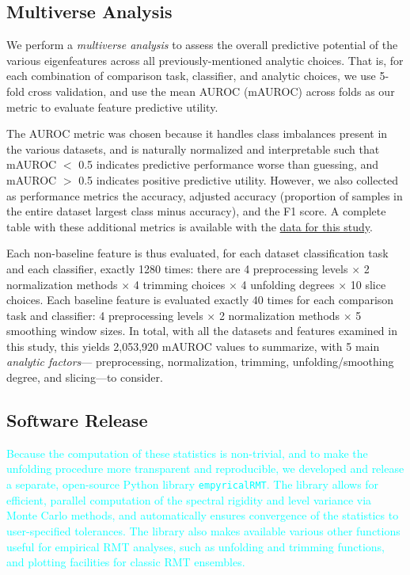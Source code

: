 \documentclass[12pt]{spieman}  %
\newcommand{\code}[1]{\small\texttt{#1}\normalsize}
\begin{document}
\begin{spacing}{2}
\subsection{Multiverse Analysis}
\label{sec:multiverse}

We perform a \textit{multiverse
analysis}\cite{steegenIncreasingTransparencyMultiverse2016} to assess the
overall predictive potential of the various eigenfeatures across all
previously-mentioned analytic choices. That is, for each combination of
comparison task, classifier, and analytic choices, we use 5-fold cross
validation, and use the mean AUROC (mAUROC) across folds as our metric to
evaluate feature predictive utility.

The AUROC metric was chosen because it handles class imbalances present in the
various datasets, and is naturally normalized and interpretable such that
mAUROC \(<\) 0.5 indicates predictive performance worse than guessing, and
mAUROC \(>\) 0.5 indicates positive predictive
utility\cite{mandrekarReceiverOperatingCharacteristic2010}. However, we also
collected as performance metrics the accuracy, adjusted accuracy (proportion of
samples in the entire dataset largest class minus accuracy), and the F1 score.
A complete table with these additional metrics is available with the
\hyperref[sec:data-and-code]{data for this study}.

Each non-baseline feature is thus evaluated, for each dataset classification
task and each classifier, exactly 1280 times: there are 4 preprocessing levels
\(\times\) 2 normalization methods \(\times\) 4 trimming choices \(\times\) 4
unfolding degrees  \(\times\) 10 slice choices. Each baseline feature is
evaluated exactly 40 times for each comparison task and classifier: 4
preprocessing levels \(\times\) 2 normalization methods \(\times\) 5 smoothing
window sizes. In total, with all the datasets and features examined in this
study, this yields 2,053,920 mAUROC values to summarize, with 5 main
\textit{analytic factors}— preprocessing, normalization, trimming,
unfolding/smoothing degree, and slicing—to consider.

\subsection{Software Release}

\textcolor{cyan}{Because the computation of these statistics is
non-trivial, and to make the unfolding procedure more transparent and
reproducible, we developed and release a separate, open-source Python library
\code{empyricalRMT}\cite{dm-bergerStfxecutablesEmpyricalRMTV12022}. The library
allows for efficient, parallel computation of the spectral rigidity and level
variance via Monte Carlo methods, and automatically ensures convergence of the
statistics to user-specified tolerances. The library also makes available
various other functions useful for empirical RMT analyses, such as unfolding
and trimming functions, and plotting facilities for classic RMT ensembles.}



\end{spacing}
\end{document}
